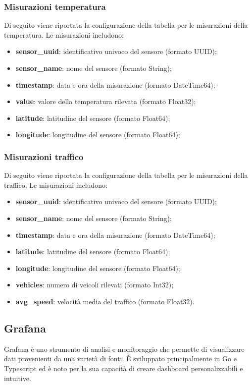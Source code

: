 \subsubsection{Misurazioni temperatura}
Di seguito viene riportata la configurazione della tabella per le misurazioni della temperatura. Le misurazioni includono:
\begin{itemize}
    \item \textbf{sensor\_uuid}: identificativo univoco del sensore (formato UUID);
    \item \textbf{sensor\_name}: nome del sensore (formato String);
    \item \textbf{timestamp}: data e ora della misurazione (formato DateTime64);
    \item \textbf{value}: valore della temperatura rilevata (formato Float32);
    \item \textbf{latitude}: latitudine del sensore (formato Float64);
    \item \textbf{longitude}: longitudine del sensore (formato Float64);
\end{itemize}
\subsubsection{Misurazioni traffico}
Di seguito viene riportata la configurazione della tabella per le misurazioni della traffico. Le misurazioni includono:
\begin{itemize}
    \item \textbf{sensor\_uuid}: identificativo univoco del sensore (formato UUID);
    \item \textbf{sensor\_name}: nome del sensore (formato String);
    \item \textbf{timestamp}: data e ora della misurazione (formato DateTime64);
    \item \textbf{latitude}: latitudine del sensore (formato Float64);
    \item \textbf{longitude}: longitudine del sensore (formato Float64);
    \item \textbf{vehicles}: numero di veicoli rilevati (formato Int32);
    \item \textbf{avg\_speed}: velocità media del traffico (formato Float32).
\end{itemize}
\subsection{Grafana}
Grafana è uno strumento di analisi e monitoraggio che permette di visualizzare dati provenienti da una varietà di fonti. È sviluppato principalmente in Go e Typescript ed è noto per la sua capacità di creare dashboard personalizzabili e intuitive.
